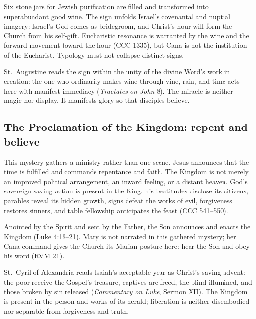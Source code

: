 Six stone jars for Jewish purification are filled and transformed into superabundant good wine. The sign unfolds Israel's covenantal and nuptial imagery: Israel's God comes as bridegroom, and Christ's hour will form the Church from his self-gift. Eucharistic resonance is warranted by the wine and the forward movement toward the hour (CCC 1335), but Cana is not the institution of the Eucharist. Typology must not collapse distinct signs.

St.~Augustine reads the sign within the unity of the divine Word's work in creation: the one who ordinarily makes wine through vine, rain, and time acts here with manifest immediacy (\emph{Tractates on John} 8). The miracle is neither magic nor display. It manifests glory so that disciples believe.

\subsection{The Proclamation of the Kingdom: repent and believe}


This mystery gathers a ministry rather than one scene. Jesus announces that the time is fulfilled and commands repentance and faith. The Kingdom is not merely an improved political arrangement, an inward feeling, or a distant heaven. God's sovereign saving action is present in the King: his beatitudes disclose its citizens, parables reveal its hidden growth, signs defeat the works of evil, forgiveness restores sinners, and table fellowship anticipates the feast (CCC 541--550).

Anointed by the Spirit and sent by the Father, the Son announces and enacts the Kingdom (Luke 4:18--21). Mary is not narrated in this gathered mystery; her Cana command gives the Church its Marian posture here: hear the Son and obey his word (RVM 21).

St.~Cyril of Alexandria reads Isaiah's acceptable year as Christ's saving advent: the poor receive the Gospel's treasure, captives are freed, the blind illumined, and those broken by sin released (\emph{Commentary on Luke}, Sermon XII). The Kingdom is present in the person and works of its herald; liberation is neither disembodied nor separable from forgiveness and truth.

